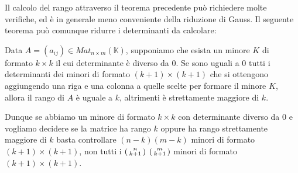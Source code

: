 Il calcolo del rango attraverso il teorema precedente pu\`o richiedere molte
verifiche, ed \`e in generale meno conveniente della riduzione di Gauss. Il
seguente teorema pu\`o comunque ridurre i determinanti da calcolare:

\begin{theorem}
	Data $A = (a_{ij}) \in Mat_{n \times m}(\mathbb{K})$, supponiamo
	che esista un minore $K$ di formato $k \times k$ il cui determinante \`e
	diverso da 0. Se sono uguali a 0 tutti i determinanti dei minori di formato
	$(k + 1) \times (k + 1)$ che si ottengono aggiungendo una riga e una colonna
	a quelle scelte per formare il minore $K$, allora il rango di $A$ \`e uguale
	a $k$, altrimenti \`e strettamente maggiore di $k$.
\end{theorem}

Dunque se abbiamo un minore di formato $k \times k$ con determinante diverso da 0
e vogliamo decidere se la matrice ha rango $k$ oppure ha rango strettamente
maggiore di $k$ basta controllare $(n - k)(m - k)$ minori di formato
$(k + 1) \times (k + 1)$, non tutti i
$\begin{psmallmatrix} n \\ k + 1 \end{psmallmatrix}$
$\begin{psmallmatrix} m \\ k + 1 \end{psmallmatrix}$ minori di formato
$(k + 1) \times (k + 1)$.